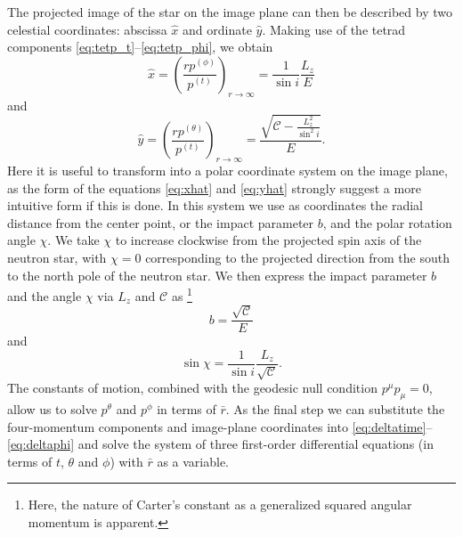 \documentclass[iop, usenatbib]{emulateapj}
\newcommand{\be}{\begin{equation}}
\newcommand{\ee}{\end{equation}}
\renewcommand{\vec}[1]{\ensuremath{\boldsymbol{#1}}}
\newcommand{\Ca}{\ensuremath{\mathcal{C}}}
\newcommand{\rb}{\ensuremath{\bar{r}}}
\newcommand{\wb}{\ensuremath{\bar{\omega}}}
\newcommand{\nub}{\ensuremath{\bar{\nu}}}
\begin{document}
The projected image of the star on the image plane can then be described by two celestial coordinates:
abscissa $\hat{x}$ and ordinate $\hat{y}$.
Making use of the tetrad components
\eqref{eq:tetp_t}--\eqref{eq:tetp_phi}, we obtain \citep[][p.347]{cha}
\be\label{eq:xhat}
\hat{x} = \left( \frac{rp^{(\phi)}}{p^{(t)}} \right)_{r \rightarrow \infty} = \frac{1}{\sin i} \frac{L_z}{E}
\ee
and
\be\label{eq:yhat}
\hat{y} = \left( \frac{rp^{(\theta)}}{p^{(t)}} \right)_{r \rightarrow \infty} = \frac{\sqrt{\Ca - \frac{L_z^2}{\sin^2 i}}}{E}.
\ee
Here it is useful to transform into a polar coordinate system on the
image plane, as the
form of the equations \eqref{eq:xhat} and \eqref{eq:yhat} strongly
suggest a more intuitive form if this is done. In this system
we use as coordinates the radial distance from the center point, or the impact
parameter $b$, and the polar rotation angle $\chi$.  We take $\chi$ to
increase clockwise from the projected spin axis of the neutron star,
with $\chi=0$ corresponding to the projected direction from the south to
the north pole of the neutron star.  We then express the impact
parameter $b$ and the angle $\chi$ via 
$L_z$ and $\Ca$ as%
\footnote{
    Here, the nature of Carter's constant as a generalized squared
    angular momentum is apparent.
}%
\be
b = \frac{\sqrt{\Ca}}{E}
\ee
and
\be
\sin \chi = \frac{1}{\sin i} \frac{L_z}{\sqrt{\Ca}}.
\ee
The constants of motion, combined with the geodesic null condition
$p^\mu p_\mu = 0$, allow us to solve $p^\theta$ and $p^\phi$ in
terms of $\rb$.
As the final step we can substitute the four-momentum components and
image-plane coordinates into \eqref{eq:deltatime}--\eqref{eq:deltaphi}
and solve the system of three first-order differential equations (in
terms of $t$, $\theta$ and $\phi$) with $\rb$ as a variable.
\end{document}
